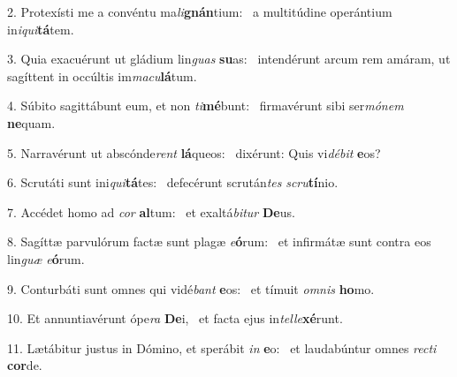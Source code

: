 2. Protexísti me a convéntu ma\textit{li}\textbf{gnán}tium: \ast\  a multitúdine operántium in\textit{i}\textit{qui}\textbf{tá}tem.\

3. Quia exacuérunt ut gládium lin\textit{guas} \textbf{su}as: \ast\  intendérunt arcum rem amáram, ut sagíttent in occúltis im\textit{ma}\textit{cu}\textbf{lá}tum.\

4. Súbito sagittábunt eum, et non \textit{ti}\textbf{mé}bunt: \ast\  firmavérunt sibi ser\textit{mó}\textit{nem} \textbf{ne}quam.\

5. Narravérunt ut abscónde\textit{rent} \textbf{lá}queos: \ast\  dixérunt: Quis vi\textit{dé}\textit{bit} \textbf{e}os?\

6. Scrutáti sunt ini\textit{qui}\textbf{tá}tes: \ast\  defecérunt scrután\textit{tes} \textit{scru}\textbf{tí}nio.\

7. Accédet homo ad \textit{cor} \textbf{al}tum: \ast\  et exaltá\textit{bi}\textit{tur} \textbf{De}us.\

8. Sagíttæ parvulórum factæ sunt plagæ \textit{e}\textbf{ó}rum: \ast\  et infirmátæ sunt contra eos lin\textit{guæ} \textit{e}\textbf{ó}rum.\

9. Conturbáti sunt omnes qui vidé\textit{bant} \textbf{e}os: \ast\  et tímuit \textit{om}\textit{nis} \textbf{ho}mo.\

10. Et annuntiavérunt ópe\textit{ra} \textbf{De}i, \ast\  et facta ejus in\textit{tel}\textit{le}\textbf{xé}runt.\

11. Lætábitur justus in Dómino, et sperábit \textit{in} \textbf{e}o: \ast\  et laudabúntur omnes \textit{rec}\textit{ti} \textbf{cor}de.\


